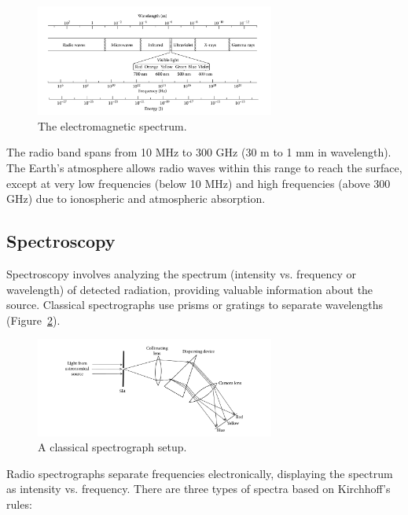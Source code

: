 \begin{figure}[H]
    \centering
    \includegraphics[width=0.7\textwidth]{Images/em_spectrum.png}
    \caption{The electromagnetic spectrum.}
    \label{fig:em_spectrum}
\end{figure}

The radio band spans from 10 MHz to 300 GHz (30 m to 1 mm in wavelength). The Earth's atmosphere allows radio waves within this range to reach the surface, except at very low frequencies (below 10 MHz) and high frequencies (above 300 GHz) due to ionospheric and atmospheric absorption.

\subsection{Spectroscopy}

Spectroscopy involves analyzing the spectrum (intensity vs. frequency or wavelength) of detected radiation, providing valuable information about the source. Classical spectrographs use prisms or gratings to separate wavelengths (Figure~\ref{fig:spectrograph}).

\begin{figure}[H]
    \centering
    \includegraphics[width=0.7\textwidth]{Images/spectrograph.png}
    \caption{A classical spectrograph setup.}
    \label{fig:spectrograph}
\end{figure}

Radio spectrographs separate frequencies electronically, displaying the spectrum as intensity vs. frequency. There are three types of spectra based on Kirchhoff’s rules:

